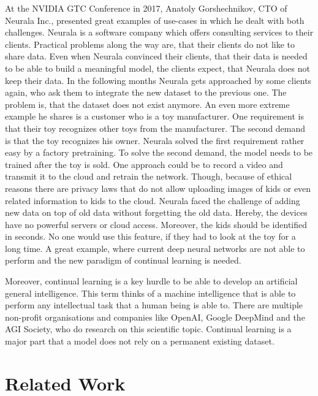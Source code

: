 At the NVIDIA GTC Conference in 2017, Anatoly Gorshechnikov, CTO of Neurala Inc., presented great examples of use-cases in which he dealt with both challenges.
Neurala is a software company which offers consulting services to their clients.
Practical problems along the way are, that their clients do not like to share data.
Even when Neurala convinced their clients, that their data is needed to be able to build a meaningful model, the clients expect, that Neurala does not keep their data.
In the following months Neurala gets approached by some clients again, who ask them to integrate the new dataset to the previous one.
The problem is, that the dataset does not exist anymore.
\hfill \break
An even more extreme example he shares is a customer who is a toy manufacturer.
One requirement is that their toy recognizes other toys from the manufacturer.
The second demand is that the toy recognizes his owner.
Neurala solved the first requirement rather easy by a factory pretraining.
To solve the second demand, the model needs to be trained after the toy is sold.
One approach could be to record a video and transmit it to the cloud and retrain the network.
Though, because of ethical reasons there are privacy laws that do not allow uploading images of kids or even related information to kids to the cloud.
Neurala faced the challenge of adding new data on top of old data without forgetting the old data.
Hereby, the devices have no powerful servers or cloud access.
Moreover, the kids should be identified in seconds.
No one would use this feature, if they had to look at the toy for a long time.
\hfill \break
A great example, where current deep neural networks are not able to perform and the new paradigm of continual learning is needed.
\cite{neurala_video}

Moreover, continual learning is a key hurdle to be able to develop an artificial general intelligence.
This term thinks of a machine intelligence that is able to perform any intellectual task that a human being is able to.
There are multiple non-profit organisations and companies like OpenAI, Google DeepMind and the AGI Society, who do research on this scientific topic.
Continual learning is a major part that a model does not rely on a permanent existing dataset.

\section{Related Work}
\label{intro_related_work}

